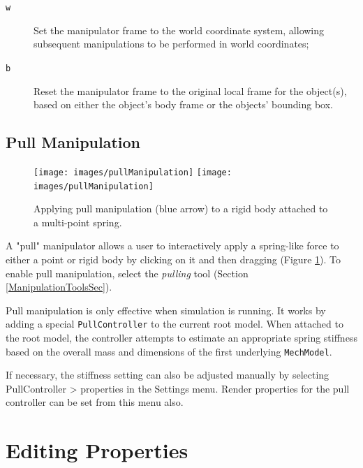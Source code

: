 \documentclass{article}
\begin{document}
\begin{description}

\item[{\tt w}]\mbox{}

Set the manipulator frame to the world coordinate system, allowing
subsequent manipulations to be performed in world coordinates;

\item[{\tt b}]\mbox{}

Reset the manipulator frame to the original local frame for the
object(s), based on either the object's body frame or the objects'
bounding box.

\end{description}

\subsection{Pull Manipulation}
\label{PullManipulationSec}

\begin{figure}
\begin{center}
\iflatexml
\texttt{[image: images/pullManipulation]}
\else
\texttt{[image: images/pullManipulation]}
\fi
\end{center}
\caption{Applying pull manipulation (blue arrow) to a rigid body 
attached to a multi-point spring.}%
\label{PullManipulationFig}
\end{figure}

A "pull" manipulator allows a user to interactively apply a
spring-like force to either a point or rigid body by clicking on it
and then dragging (Figure \ref{PullManipulationFig}). To enable pull
manipulation, select the {\it pulling} tool (Section
\ref{ManipulationToolsSec}).

Pull manipulation is only effective when simulation is running.  It
works by adding a special {\tt PullController} to the current root
model. When attached to the root model, the controller attempts to
estimate an appropriate spring stiffness based on the overall mass and
dimensions of the first underlying {\tt MechModel}.

If necessary, the stiffness setting can also be adjusted manually by
selecting {\sf PullController > properties} in the {\sf Settings}
menu.  Render properties for the pull controller can be set from this
menu also.

\section{Editing Properties}
\end{document}
